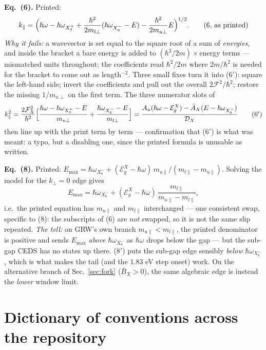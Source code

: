 \documentclass[11pt,a4paper]{article}
\numberwithin{equation}{section}
\newcommand{\hw}{\hbar\omega}
\newcommand{\EgX}{\mathcal{E}_g^{X}}
\newcommand{\cD}{\mathcal{D}}
\newcommand{\cF}{\mathcal{F}}
\newcommand{\Ab}{\bar{A}}
\newcommand{\Bb}{\bar{B}}
\newcommand{\kperp}{k_{\perp}}
\newcommand{\kpar}{k_{\parallel}}
\newcommand{\wXu}{\hbar\omega_{X_6^-}}
\newcommand{\wXl}{\hbar\omega_{X_7^+}}
\begin{document}
\medskip
\textbf{Eq.\ (6).}  Printed:
\begin{equation}
\kpar=\Bigl(\hw-\wXl+\frac{\hbar^{2}}{2m_{l\perp}}(\wXu-E)
-\frac{\hbar^{2}}{2m_{u\perp}}E\Bigr)^{1/2}.
\tag{6, as printed}
\end{equation}
\emph{Why it fails:} a wavevector is set equal to the square root of a
sum of \emph{energies}, and inside the bracket a bare energy is added
to $(\hbar^2/2m)\times$energy terms --- mismatched units throughout;
the coefficients read $\hbar^2/2m$ where $2m/\hbar^2$ is needed for
the bracket to come out as length$^{-2}$.  Three small fixes turn it
into ($6'$): square the left-hand side; invert the coefficients and
pull out the overall $2\cF^2/\hbar^2$; restore the missing
$1/m_{u\perp}$ on the first term.  The three numerator slots of
\begin{equation}
\kpar^{2}
=\frac{2\cF_X^{2}}{\hbar^{2}}\Bigl[
\frac{\hw-\wXl-E}{m_{u\perp}}
+\frac{\wXu-E}{m_{l\perp}}\Bigr]
=\frac{A_u(\hw-\EgX)-\Ab_X(E-\wXu)}{\cD_X}
\tag{6$'$}
\end{equation}
then line up with the print term by term --- confirmation that ($6'$)
is what was meant: a typo, but a disabling one, since the printed
formula is unusable as written.

\medskip
\textbf{Eq.\ (8).}  Printed:
$E_{\max}=\wXu+(\EgX-\hw)\,m_{u\parallel}/(m_{l\parallel}-m_{u\parallel})$.
Solving the model for the $\kperp=0$ edge gives
\begin{equation}
E_{\max}
=\wXu+(\EgX-\hw)\,\frac{m_{l\parallel}}{m_{u\parallel}-m_{l\parallel}},
\tag{8$'$}
\end{equation}
i.e.\ the printed equation has $m_{u\parallel}$ and $m_{l\parallel}$
interchanged --- one consistent swap, specific to (8): the subscripts
of (6) are \emph{not} swapped, so it is not the same slip repeated.
\emph{The tell:} on GRW's own branch $m_{u\parallel}<m_{l\parallel}$,
the printed denominator is positive and sends $E_{\max}$ \emph{above}
$\wXu$ as $\hw$ drops below the gap --- but the sub-gap CEDS has no
states up there.  ($8'$) puts the sub-gap edge sensibly \emph{below}
$\wXu$, which is what makes the tail (and the $1.83$ eV step onset)
work.  On the alternative branch of Sec.~\ref{sec:fork}
($\Bb_X>0$), the same algebraic edge is instead the \emph{lower}
window limit.

\section{Dictionary of conventions across the repository}\label{app:dict}
\end{document}
